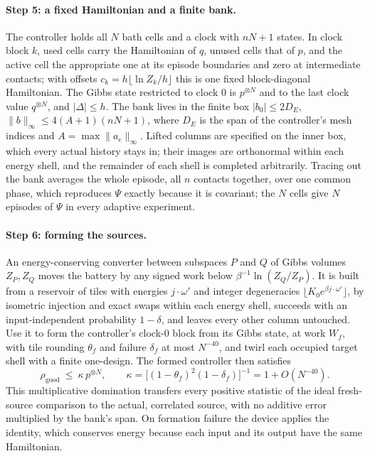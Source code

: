 \paragraph{Step 5: a fixed Hamiltonian and a finite bank.} The controller holds all $N$ bath cells and a clock with $nN+1$ states. In clock block $k$, used cells carry the Hamiltonian of $q$, unused cells that of $p$, and the active cell the appropriate one at its episode boundaries and zero at intermediate contacts; with offsets $c_k=h\lfloor\ln Z_k/h\rfloor$ this is one fixed block-diagonal Hamiltonian. The Gibbs state restricted to clock $0$ is $p^{\otimes N}$ and to the last clock value $q^{\otimes N}$, and $|\Delta|\le h$. The bank lives in the finite box $|b_0|\le2D_E$, $\|b\|_\infty\le4(A+1)(nN+1)$, where $D_E$ is the span of the controller's mesh indices and $A=\max\|a_e\|_\infty$. Lifted columns are specified on the inner box, which every actual history stays in; their images are orthonormal within each energy shell, and the remainder of each shell is completed arbitrarily. Tracing out the bank averages the whole episode, all $n$ contacts together, over one common phase, which reproduces $\Psi$ exactly because it is covariant; the $N$ cells give $N$ episodes of $\Psi$ in every adaptive experiment.

\paragraph{Step 6: forming the sources.} An energy-conserving converter between subspaces $P$ and $Q$ of Gibbs volumes $Z_P,Z_Q$ moves the battery by any signed work below $\beta^{-1}\ln(Z_Q/Z_P)$. It is built from a reservoir of tiles with energies $j\cdot\omega'$ and integer degeneracies $\lfloor K_0e^{\beta j\cdot\omega'}\rfloor$, by isometric injection and exact swaps within each energy shell, succeeds with an input-independent probability $1-\delta$, and leaves every other column untouched. Use it to form the controller's clock-$0$ block from its Gibbs state, at work $W_f$, with tile rounding $\theta_f$ and failure $\delta_f$ at most $N^{-40}$, and twirl each occupied target shell with a finite one-design. The formed controller then satisfies
\[
\rho_{\mathrm{good}}\ \le\ \kappa\,p^{\otimes N},\qquad \kappa=\bigl[(1-\theta_f)^2(1-\delta_f)\bigr]^{-1}=1+O(N^{-40}).
\]
This multiplicative domination transfers every positive statistic of the ideal fresh-source comparison to the actual, correlated source, with no additive error multiplied by the bank's span. On formation failure the device applies the identity, which conserves energy because each input and its output have the same Hamiltonian.

